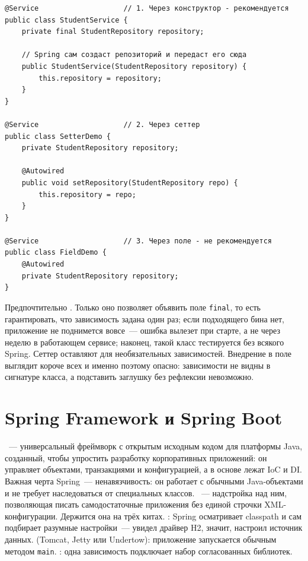\begin{listing}[H]
\begin{verbatim}
@Service                    // 1. Через конструктор - рекомендуется
public class StudentService {
    private final StudentRepository repository;

    // Spring сам создаст репозиторий и передаст его сюда
    public StudentService(StudentRepository repository) {
        this.repository = repository;
    }
}

@Service                    // 2. Через сеттер
public class SetterDemo {
    private StudentRepository repository;

    @Autowired
    public void setRepository(StudentRepository repo) {
        this.repository = repo;
    }
}

@Service                    // 3. Через поле - не рекомендуется
public class FieldDemo {
    @Autowired
    private StudentRepository repository;
}
\end{verbatim}
\caption{Три способа внедрения зависимости}
\label{lst:07-1}
\end{listing}

Предпочтительно . Только оно позволяет объявить
поле \texttt{final}, то есть гарантировать, что зависимость задана один раз;
если подходящего бина нет, приложение не поднимется вовсе~--- ошибка вылезет
при старте, а не через неделю в работающем сервисе; наконец, такой класс
тестируется без всякого Spring. Сеттер оставляют для необязательных
зависимостей. Внедрение в поле выглядит короче всех и именно поэтому опасно:
зависимости не видны в сигнатуре класса, а подставить заглушку без рефлексии
невозможно.

\section{Spring Framework и Spring Boot}

~--- универсальный фреймворк с открытым исходным кодом
для платформы Java, созданный, чтобы упростить разработку корпоративных
приложений: он управляет объектами, транзакциями и конфигурацией, а в основе
лежат IoC и DI. Важная черта Spring~--- ненавязчивость: он работает с обычными
Java-объектами и не требует наследоваться от специальных классов.
~--- надстройка над ним, позволяющая писать самодостаточные
приложения без единой строчки XML-конфигурации. Держится она на трёх китах.
: Spring осматривает classpath и сам подбирает разумные
настройки~--- увидел драйвер H2, значит, настроил источник данных.
 (Tomcat, Jetty или Undertow): приложение запускается
обычным методом \texttt{main}. : одна зависимость
подключает набор согласованных библиотек.

